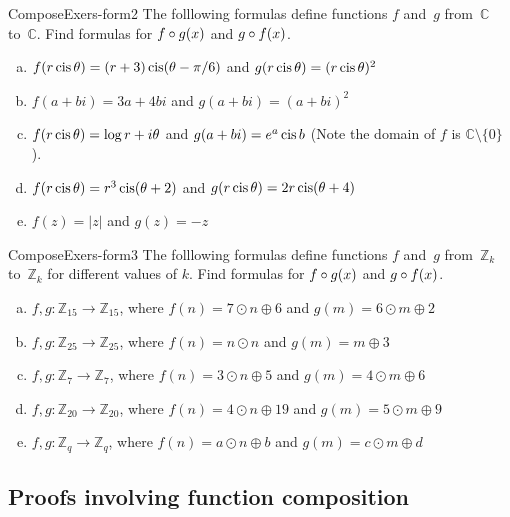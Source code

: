 \begin{exercise}{ComposeExers-form2} 
 The folllowing formulas define functions $f$ and~$g$ from~$\mathbb{C}$ to~$\mathbb{C}$. Find formulas for $f \circ g(x)$ and $g \circ f(x)$.
\begin{enumerate}[(a)]
\item \label{composeC1}
 $f(r \operatorname{cis} \theta) = (r+3)\operatorname{cis}(\theta - \pi/6)$ and $g(r \operatorname{cis} \theta) = (r \operatorname{cis} \theta)^2$ 
\item \label{composeC2}
 $f(a + bi) = 3a + 4bi$ and $g(a + bi) = (a+bi)^2$ 
\item \label{composeC3}
 $f(r \operatorname{cis} \theta) = \log r + i \theta$ and $g(a+bi) = e^a \operatorname{cis} b$  (Note the domain of $f$ is $\mathbb{C} \setminus \{0\}$).
\item \label{composeC4}
 $f(r \operatorname{cis} \theta) = r^3 \operatorname{cis} (\theta + 2)$ and $g(r \operatorname{cis} \theta) = 2r \operatorname{cis} (\theta + 4)$ 
\item \label{composeC5}
 $f(z) = |z|$ and $g(z) = -z$ 
\end{enumerate}
\end{exercise}



\begin{exercise}{ComposeExers-form3} 
 The folllowing formulas define functions $f$ and~$g$ from~$\mathbb{Z}_k$ to~$\mathbb{Z}_k$ for different values of $k$. Find formulas for $f \circ g(x)$ and $g \circ f(x)$.
\begin{enumerate}[(a)]
\item \label{composeZ1}
$f,g:\mathbb{Z}_{15} \rightarrow \mathbb{Z}_{15}$, where  $f(n) = 7 \odot n \oplus 6$ and $g(m) = 6\odot m \oplus 2$ 
\item \label{composeZ2}
$f,g:\mathbb{Z}_{25} \rightarrow \mathbb{Z}_{25}$, where  $f(n) = n \odot n$ and $g(m) = m \oplus 3$ 
\item \label{composeZ3}
$f,g:\mathbb{Z}_{7} \rightarrow \mathbb{Z}_{7}$, where  $f(n) = 3\odot n \oplus 5$ and $g(m) =4 \odot m \oplus 6$ 
\item \label{composeZ4}
$f,g:\mathbb{Z}_{20} \rightarrow \mathbb{Z}_{20}$, where  $f(n) = 4\odot n \oplus 19$ and $g(m) =5 \odot m \oplus 9$ 
\item
$f,g:\mathbb{Z}_{q} \rightarrow \mathbb{Z}_{q}$, where  $f(n) = a\odot n \oplus b$ and $g(m) =c \odot m \oplus d$ 

\end{enumerate}
\end{exercise}


\subsection{Proofs involving function composition}

